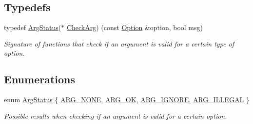 \subsection*{Typedefs}
\begin{DoxyCompactItemize}
\item 
typedef \hyperlink{namespaceoption_aee8c76a07877335762631491e7a5a1a9}{Arg\+Status}($\ast$ \hyperlink{namespaceoption_a4cdf403efae65e18bf850e2001b12a2a}{Check\+Arg}) (const \hyperlink{classoption_1_1Option}{Option} \&option, bool msg)
\begin{DoxyCompactList}\small\item\em Signature of functions that check if an argument is valid for a certain type of option. \end{DoxyCompactList}\end{DoxyCompactItemize}
\subsection*{Enumerations}
\begin{DoxyCompactItemize}
\item 
enum \hyperlink{namespaceoption_aee8c76a07877335762631491e7a5a1a9}{Arg\+Status} \{ \hyperlink{namespaceoption_aee8c76a07877335762631491e7a5a1a9a353903b042e8eb0aa2f60c0043a58a7e}{A\+R\+G\+\_\+\+N\+O\+NE}, 
\hyperlink{namespaceoption_aee8c76a07877335762631491e7a5a1a9a445e08cb1747e5a22929e7ef2da43b55}{A\+R\+G\+\_\+\+OK}, 
\hyperlink{namespaceoption_aee8c76a07877335762631491e7a5a1a9a83e0837c79c957525918111d33cab3a9}{A\+R\+G\+\_\+\+I\+G\+N\+O\+RE}, 
\hyperlink{namespaceoption_aee8c76a07877335762631491e7a5a1a9a9528e32563b795bd2930b12d0a5e382d}{A\+R\+G\+\_\+\+I\+L\+L\+E\+G\+AL}
 \}\begin{DoxyCompactList}\small\item\em Possible results when checking if an argument is valid for a certain option. \end{DoxyCompactList}
\end{DoxyCompactItemize}
